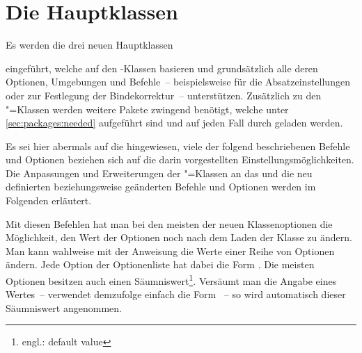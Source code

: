 \chapter[Die Klassen tudscrbook, tudscrreprt und tudscrartcl]{Die Hauptklassen}
\label{sec:mainclasses}
%
%
\begin{Declaration*}{}
\begin{Declaration*}{}
\begin{Declaration*}{}
Es werden die drei neuen Hauptklassen
%
\begin{description}
\item {}
\item {}
\item {}
\end{description}
%
eingeführt, welche auf den \KOMAScript-Klassen basieren und grundsätzlich alle
deren Optionen, Umgebungen und Befehle~-- beispielsweise  für 
die Absatzeinstellungen oder  zur Festlegung der Bindekorrektur~-- 
unterstützen. Zusätzlich zu den \KOMAScript"=Klassen werden weitere Pakete 
zwingend benötigt, welche unter \autoref{sec:packages:needed} aufgeführt sind 
und auf jeden Fall durch \TUDScript geladen werden.

Es sei hier abermals auf die  
hingewiesen, viele der folgend beschriebenen Befehle und Optionen beziehen sich 
auf die darin vorgestellten Einstellungsmöglichkeiten. Die Anpassungen und 
Erweiterungen der \KOMAScript"=Klassen an das \CD und die neu definierten 
beziehungsweise geänderten Befehle und Optionen werden im Folgenden erläutert.

\begin{Declaration}{}
\begin{Declaration}{}
\printdeclarationlist%
%
%
Mit diesen Befehlen hat man bei den meisten der neuen Klassenoptionen die 
Möglichkeit, den Wert der Optionen noch nach dem Laden der Klasse zu ändern.
Man kann wahlweise mit der Anweisung  die Werte einer Reihe 
von Optionen ändern. Jede Option der Optionenliste hat dabei die Form
\PValue{=}. Die meisten Optionen besitzen auch einen 
Säumniswert\footnote{engl.: default value}. Versäumt man die Angabe eines 
Wertes~-- verwendet demzufolge einfach die Form ~-- so wird 
automatisch dieser Säumniswert angenommen.


\end{Declaration}
\end{Declaration}
\end{Declaration*}
\end{Declaration*}
\end{Declaration*}
